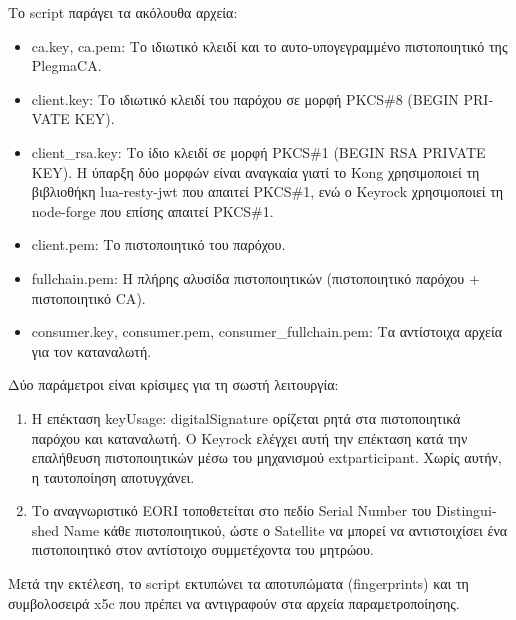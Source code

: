 Το \textlatin{script} παράγει τα ακόλουθα αρχεία:

\begin{itemize}
    \item \textlatin{ca.key}, \textlatin{ca.pem}: Το ιδιωτικό κλειδί και
    το αυτο-υπογεγραμμένο πιστοποιητικό της \textlatin{PlegmaCA}.
    \item \textlatin{client.key}: Το ιδιωτικό κλειδί του παρόχου σε
    μορφή \textlatin{PKCS\#8} (\textlatin{BEGIN PRIVATE KEY}).
    \item \textlatin{client\_rsa.key}: Το ίδιο κλειδί σε μορφή
    \textlatin{PKCS\#1} (\textlatin{BEGIN RSA PRIVATE KEY}). Η ύπαρξη
    δύο μορφών είναι αναγκαία γιατί το \textlatin{Kong} χρησιμοποιεί
    τη βιβλιοθήκη \textlatin{lua-resty-jwt} που απαιτεί
    \textlatin{PKCS\#1}, ενώ ο \textlatin{Keyrock} χρησιμοποιεί
    τη \textlatin{node-forge} που επίσης απαιτεί \textlatin{PKCS\#1}.
    \item \textlatin{client.pem}: Το πιστοποιητικό του παρόχου.
    \item \textlatin{fullchain.pem}: Η πλήρης αλυσίδα πιστοποιητικών
    (πιστοποιητικό παρόχου + πιστοποιητικό \textlatin{CA}).
    \item \textlatin{consumer.key}, \textlatin{consumer.pem},
    \textlatin{consumer\_fullchain.pem}: Τα αντίστοιχα αρχεία για
    τον καταναλωτή.
\end{itemize}

Δύο παράμετροι είναι κρίσιμες για τη σωστή λειτουργία:

\begin{enumerate}
    \item Η επέκταση \textlatin{keyUsage: digitalSignature} ορίζεται
    ρητά στα πιστοποιητικά παρόχου και καταναλωτή. Ο \textlatin{Keyrock}
    ελέγχει αυτή την επέκταση κατά την επαλήθευση πιστοποιητικών
    μέσω του μηχανισμού \textlatin{extparticipant}. Χωρίς αυτήν,
    η ταυτοποίηση αποτυγχάνει.

    \item Το αναγνωριστικό \textlatin{EORI} τοποθετείται στο πεδίο
    \textlatin{Serial Number} του \textlatin{Distinguished Name}
    κάθε πιστοποιητικού, ώστε ο \textlatin{Satellite} να μπορεί
    να αντιστοιχίσει ένα πιστοποιητικό στον αντίστοιχο συμμετέχοντα
    του μητρώου.
\end{enumerate}

Μετά την εκτέλεση, το \textlatin{script} εκτυπώνει τα αποτυπώματα
(\textlatin{fingerprints}) και τη συμβολοσειρά \textlatin{x5c} που
πρέπει να αντιγραφούν στα αρχεία παραμετροποίησης.


